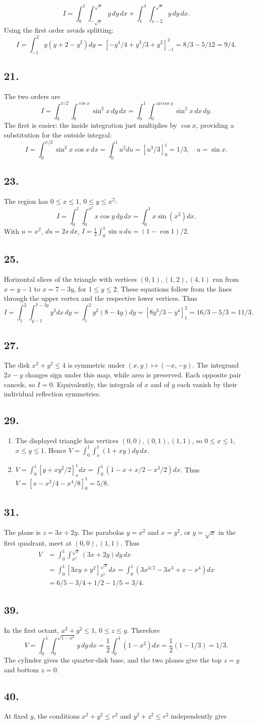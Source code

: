 \documentclass[11pt]{article}
\newcommand{\ex}[1]{\subsection*{#1.}}
\newcommand{\ans}[1]{\boxed{#1}}
\begin{document}
\[I=\int_0^1\int_{-\sqrt x}^{\sqrt x}y\,dy\,dx+\int_1^4\int_{x-2}^{\sqrt x}y\,dy\,dx.\]
Using the first order avoids splitting:
\[I=\int_{-1}^2y(y+2-y^2)dy=[-y^4/4+y^3/3+y^2]_{-1}^2
=8/3-5/12=\ans{9/4}.\]
\ex{21}
The two orders are
\[I=\int_0^{\pi/2}\int_0^{\cos x}\sin^2x\,dy\,dx
=\int_0^1\int_0^{\arccos y}\sin^2x\,dx\,dy.\]
The first is easier: the inside integration just multiplies by $\cos x$, providing a substitution for the outside integral:
\[I=\int_0^{\pi/2}\sin^2x\cos x\,dx=\int_0^1u^2du=[u^3/3]_0^1=\ans{1/3},\quad u=\sin x.\]
\ex{23}
The region has $0\le x\le1$, $0\le y\le x^2$:
\[I=\int_0^1\int_0^{x^2}x\cos y\,dy\,dx=\int_0^1x\sin(x^2)dx.
\]
With $u=x^2$, $du=2x\,dx$, $I=\frac12\int_0^1\sin u\,du=\ans{(1-\cos1)/2}$.
\ex{25}
Horizontal slices of the triangle with vertices $(0,1),(1,2),(4,1)$ run from $x=y-1$ to $x=7-3y$, for $1\le y\le2$. These equations follow from the lines through the upper vertex and the respective lower vertices. Thus
\[I=\int_1^2\int_{y-1}^{7-3y}y^2dx\,dy=\int_1^2y^2(8-4y)dy
=[8y^3/3-y^4]_1^2=16/3-5/3=\ans{11/3}.\]
\ex{27}
The disk $x^2+y^2\le4$ is symmetric under $(x,y)\mapsto(-x,-y)$. The integrand $2x-y$ changes sign under this map, while area is preserved. Each opposite pair cancels, so $\ans{I=0}$. Equivalently, the integrals of $x$ and of $y$ each vanish by their individual reflection symmetries.
\ex{29}
\begin{enumerate}[label=(\alph*)]
\item The displayed triangle has vertices $(0,0),(0,1),(1,1)$, so $0\le x\le1$, $x\le y\le1$. Hence $\ans{V=\int_0^1\int_x^1(1+xy)dy\,dx}$.
\item $V=\int_0^1[y+xy^2/2]_x^1dx=\int_0^1(1-x+x/2-x^3/2)dx$. Thus $V=[x-x^2/4-x^4/8]_0^1=\ans{5/8}$.
\end{enumerate}
\ex{31}
The plane is $z=3x+2y$. The parabolas $y=x^2$ and $x=y^2$, or $y=\sqrt x$ in the first quadrant, meet at $(0,0),(1,1)$. Thus
\begin{align*}
V&=\int_0^1\int_{x^2}^{\sqrt x}(3x+2y)dy\,dx\\
&=\int_0^1[3xy+y^2]_{x^2}^{\sqrt x}dx
=\int_0^1(3x^{3/2}-3x^3+x-x^4)dx\\
&=6/5-3/4+1/2-1/5=\ans{3/4}.
\end{align*}
\ex{39}
In the first octant, $x^2+y^2\le1$, $0\le z\le y$. Therefore
\[V=\int_0^1\int_0^{\sqrt{1-x^2}}y\,dy\,dx
=\frac12\int_0^1(1-x^2)dx=\frac12(1-1/3)=\ans{1/3}.\]
The cylinder gives the quarter-disk base, and the two planes give the top $z=y$ and bottom $z=0$.
\ex{40}
At fixed $y$, the conditions $x^2+y^2\le r^2$ and $y^2+z^2\le r^2$ independently give
\end{document}
